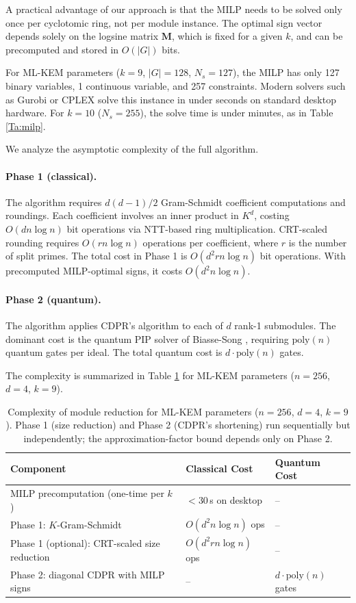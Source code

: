 \documentclass[11pt,a4paper]{article}
\theoremstyle{plain}
\theoremstyle{definition}
\theoremstyle{remark}
\begin{document}
A practical advantage of our approach is that the MILP needs to be solved only once per cyclotomic ring, not per module instance. The optimal sign vector depends solely on the logsine matrix $\mathbf{M}$, which is fixed for a given $k$, and can be precomputed and stored in $O(|G|)$ bits.

For ML-KEM parameters ($k=9$, $|G|=128$, $N_s=127$), the MILP has only 127 binary variables, 1 continuous variable, and 257 constraints. Modern solvers such as Gurobi or CPLEX solve this instance in under seconds on standard desktop hardware. For $k=10$ ($N_s=255$), the solve time is under minutes, as in Table \ref{Ta:milp}.

We analyze the asymptotic complexity of the full algorithm.

\paragraph{Phase 1 (classical).} The algorithm requires $d(d-1)/2$ Gram-Schmidt coefficient computations and roundings. Each coefficient involves an inner product in $K^d$, costing $O(dn\log n)$ bit operations via NTT-based ring multiplication. CRT-scaled rounding requires $O(rn\log n)$ operations per coefficient, where $r$ is the number of split primes. The total cost in Phase 1 is $O(d^2 r n\log n)$ bit operations. With precomputed MILP-optimal signs, it costs $O(d^2 n\log n)$.

\paragraph{Phase 2 (quantum).} The algorithm applies CDPR's algorithm to each of $d$ rank-1 submodules. The dominant cost is the quantum PIP solver of Biasse-Song \cite{BiasseSong16}, requiring $\mathrm{poly}(n)$ quantum gates per ideal. The total quantum cost is $d\cdot\mathrm{poly}(n)$ gates. 

The complexity is summarized in Table \ref{Ta:complexity} for ML-KEM parameters ($n=256$, $d=4$, $k=9$).

\begin{table}[t]
\centering
\caption{Complexity of module reduction for ML-KEM parameters ($n=256$, $d=4$, $k=9$). Phase 1 (size reduction) and Phase 2 (CDPR's shortening) run sequentially but independently; the approximation-factor bound depends only on Phase 2.}
\label{Ta:complexity}
\begin{tabular}{@{}lll@{}}
\toprule
\textbf{Component} & \textbf{Classical Cost} & \textbf{Quantum Cost}\\
\midrule
MILP precomputation (one-time per $k$)
  & $<30$\,s on desktop   & -- \\
Phase 1: $K$-Gram-Schmidt
  & $O(d^2 n\log n)$ ops  & -- \\
Phase 1 (optional): CRT-scaled size reduction
  & $O(d^2 r n\log n)$ ops & -- \\
Phase 2: diagonal CDPR with MILP signs
  & --                   & $d\cdot\mathrm{poly}(n)$ gates \\
\bottomrule
\end{tabular}
\end{table}
\end{document}
